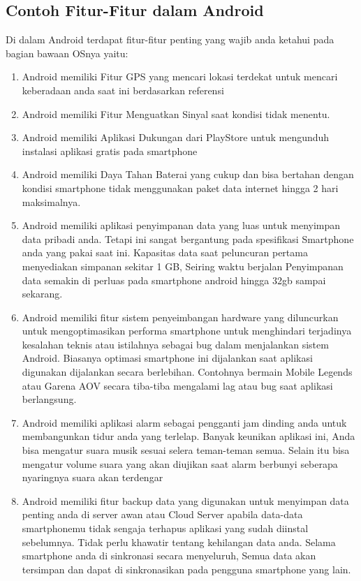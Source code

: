 		\subsection{Contoh Fitur-Fitur dalam Android}
		Di dalam Android terdapat fitur-fitur penting yang wajib anda ketahui pada bagian bawaan OSnya yaitu:
\begin{enumerate}
		\item Android memiliki Fitur GPS yang mencari lokasi terdekat untuk mencari keberadaan anda saat ini berdasarkan referensi \cite{anwar2014implementasi}
		\item Android memiliki Fitur Menguatkan Sinyal saat kondisi tidak menentu.
		\item Android memiliki Aplikasi Dukungan dari PlayStore untuk mengunduh instalasi aplikasi gratis pada smartphone
		\item Android memiliki Daya Tahan Baterai yang cukup dan bisa bertahan dengan kondisi smartphone tidak menggunakan paket data internet
			hingga 2 hari maksimalnya.
		\item Android memiliki aplikasi penyimpanan data yang luas untuk menyimpan data pribadi anda. Tetapi ini sangat bergantung pada spesifikasi
			Smartphone anda yang pakai saat ini. Kapasitas data saat peluncuran pertama menyediakan simpanan sekitar 1 GB, Seiring waktu berjalan
			Penyimpanan data semakin di perluas pada smartphone android hingga 32gb sampai sekarang.
		\item Android memiliki fitur sistem penyeimbangan hardware yang diluncurkan untuk mengoptimasikan performa smartphone untuk menghindari terjadinya
			kesalahan teknis atau istilahnya sebagai bug dalam menjalankan sistem Android. Biasanya optimasi smartphone ini dijalankan saat aplikasi digunakan
			dijalankan secara berlebihan. Contohnya bermain Mobile Legends atau Garena AOV secara tiba-tiba mengalami lag atau bug saat aplikasi berlangsung.
		\item Android memiliki aplikasi alarm sebagai pengganti jam dinding anda untuk membangunkan tidur anda yang terlelap. Banyak keunikan aplikasi ini,
			Anda bisa mengatur suara musik sesuai selera teman-teman semua. Selain itu bisa mengatur volume suara yang akan diujikan saat alarm berbunyi seberapa nyaringnya suara akan terdengar
		\item Android memiliki fitur backup data yang digunakan untuk menyimpan data penting anda di server awan atau Cloud Server apabila data-data smartphonemu tidak sengaja terhapus aplikasi yang sudah diinstal sebelumnya.
			Tidak perlu khawatir tentang kehilangan data anda. Selama smartphone anda di sinkronasi secara menyeluruh, Semua data akan tersimpan dan dapat di sinkronasikan pada pengguna smartphone yang lain.

\end{enumerate}
